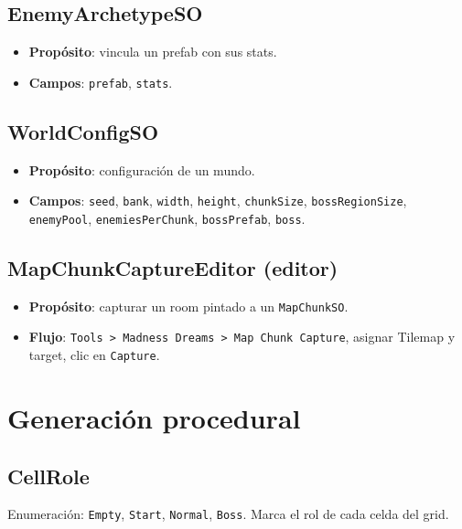 \documentclass[a4paper,12pt]{article}
\begin{document}
\subsection{EnemyArchetypeSO}

\begin{itemize}
    \item \textbf{Propósito}: vincula un prefab con sus stats.
    \item \textbf{Campos}: \texttt{prefab}, \texttt{stats}.
\end{itemize}

\subsection{WorldConfigSO}

\begin{itemize}
    \item \textbf{Propósito}: configuración de un mundo.
    \item \textbf{Campos}: \texttt{seed}, \texttt{bank}, \texttt{width}, \texttt{height}, \texttt{chunkSize}, \texttt{bossRegionSize}, \texttt{enemyPool}, \texttt{enemiesPerChunk}, \texttt{bossPrefab}, \texttt{boss}.
\end{itemize}

\subsection{MapChunkCaptureEditor (editor)}

\begin{itemize}
    \item \textbf{Propósito}: capturar un room pintado a un \texttt{MapChunkSO}.
    \item \textbf{Flujo}: \texttt{Tools > Madness Dreams > Map Chunk Capture}, asignar Tilemap y target, clic en \texttt{Capture}.
\end{itemize}

\section{Generación procedural}

\subsection{CellRole}

Enumeración: \texttt{Empty}, \texttt{Start}, \texttt{Normal}, \texttt{Boss}. Marca el rol de cada celda del grid.
\end{document}
